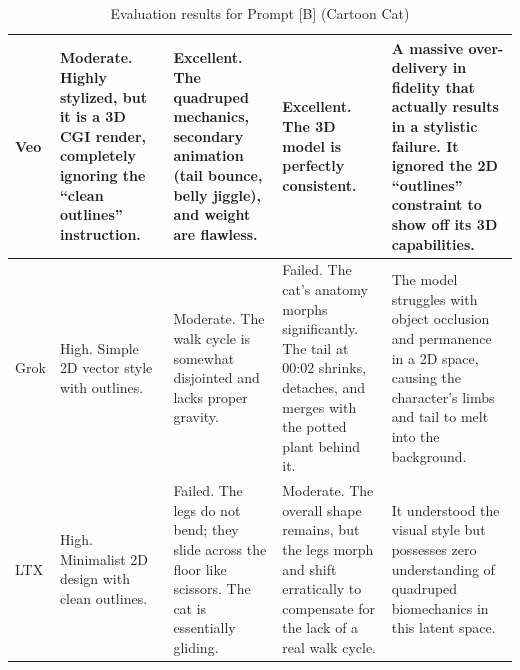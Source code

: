 \documentclass[sigconf]{acmart}
\begin{document}
\begin{table}[H]
\begin{tabularx}{\textwidth}{| l | >{\raggedright\arraybackslash}X | >{\raggedright\arraybackslash}X | >{\raggedright\arraybackslash}X | >{\raggedright\arraybackslash}X |}
        Veo            & Moderate. Highly stylized, but it is a 3D CGI render, completely ignoring the ``clean outlines'' instruction. & Excellent. The quadruped mechanics, secondary animation (tail bounce, belly jiggle), and weight are flawless.                  & Excellent. The 3D model is perfectly consistent.                                                                                 & A massive over-delivery in fidelity that actually results in a stylistic failure. It ignored the 2D ``outlines'' constraint to show off its 3D capabilities.                       \\\hline
        Grok           & High. Simple 2D vector style with outlines.                                                                   & Moderate. The walk cycle is somewhat disjointed and lacks proper gravity.                                                      & Failed. The cat's anatomy morphs significantly. The tail at 00:02 shrinks, detaches, and merges with the potted plant behind it. & The model struggles with object occlusion and permanence in a 2D space, causing the character's limbs and tail to melt into the background.                                        \\\hline
        LTX            & High. Minimalist 2D design with clean outlines.                                                               & Failed. The legs do not bend; they slide across the floor like scissors. The cat is essentially gliding.                       & Moderate. The overall shape remains, but the legs morph and shift erratically to compensate for the lack of a real walk cycle.   & It understood the visual style but possesses zero understanding of quadruped biomechanics in this latent space.                                                                    \\\hline
    \end{tabularx}
    \caption{Evaluation results for Prompt [B] (Cartoon Cat)}
    \label{tab:cartoon}
\end{table}
\end{document}
